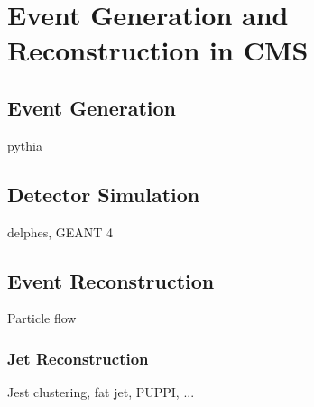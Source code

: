 \chapter{Event Generation and Reconstruction in CMS}\label{ch:gensimreco}
\section{Event Generation}
pythia
\section{Detector Simulation}
delphes, GEANT 4
\section{Event Reconstruction}
Particle flow
\subsection{Jet Reconstruction}
Jest clustering, fat jet, PUPPI, ...
